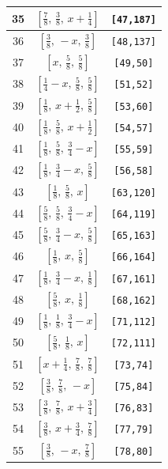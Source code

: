 \documentclass[fleqn,8pt]{jsarticle}
\begin{document}
\begin{longtable}{ccc}
35 & $\left[ \frac{7}{8},\, \frac{3}{8},\, x + \frac{1}{4} \right]$ & {\tt [47,187]} \\ \hline
36 & $\left[ \frac{3}{8},\, - x,\, \frac{3}{8} \right]$ & {\tt [48,137]} \\ \hline
37 & $\left[ x,\, \frac{5}{8},\, \frac{5}{8} \right]$ & {\tt [49,50]} \\ \hline
38 & $\left[ \frac{1}{4} - x,\, \frac{5}{8},\, \frac{5}{8} \right]$ & {\tt [51,52]} \\ \hline
39 & $\left[ \frac{1}{8},\, x + \frac{1}{2},\, \frac{5}{8} \right]$ & {\tt [53,60]} \\ \hline
40 & $\left[ \frac{1}{8},\, \frac{5}{8},\, x + \frac{1}{2} \right]$ & {\tt [54,57]} \\ \hline
41 & $\left[ \frac{1}{8},\, \frac{5}{8},\, \frac{3}{4} - x \right]$ & {\tt [55,59]} \\ \hline
42 & $\left[ \frac{1}{8},\, \frac{3}{4} - x,\, \frac{5}{8} \right]$ & {\tt [56,58]} \\ \hline
43 & $\left[ \frac{1}{8},\, \frac{5}{8},\, x \right]$ & {\tt [63,120]} \\ \hline
44 & $\left[ \frac{5}{8},\, \frac{5}{8},\, \frac{3}{4} - x \right]$ & {\tt [64,119]} \\ \hline
45 & $\left[ \frac{5}{8},\, \frac{3}{4} - x,\, \frac{5}{8} \right]$ & {\tt [65,163]} \\ \hline
46 & $\left[ \frac{1}{8},\, x,\, \frac{5}{8} \right]$ & {\tt [66,164]} \\ \hline
47 & $\left[ \frac{1}{8},\, \frac{3}{4} - x,\, \frac{1}{8} \right]$ & {\tt [67,161]} \\ \hline
48 & $\left[ \frac{5}{8},\, x,\, \frac{1}{8} \right]$ & {\tt [68,162]} \\ \hline
49 & $\left[ \frac{1}{8},\, \frac{1}{8},\, \frac{3}{4} - x \right]$ & {\tt [71,112]} \\ \hline
50 & $\left[ \frac{5}{8},\, \frac{1}{8},\, x \right]$ & {\tt [72,111]} \\ \hline
51 & $\left[ x + \frac{1}{4},\, \frac{7}{8},\, \frac{7}{8} \right]$ & {\tt [73,74]} \\ \hline
52 & $\left[ \frac{3}{8},\, \frac{7}{8},\, - x \right]$ & {\tt [75,84]} \\ \hline
53 & $\left[ \frac{3}{8},\, \frac{7}{8},\, x + \frac{3}{4} \right]$ & {\tt [76,83]} \\ \hline
54 & $\left[ \frac{3}{8},\, x + \frac{3}{4},\, \frac{7}{8} \right]$ & {\tt [77,79]} \\ \hline
55 & $\left[ \frac{3}{8},\, - x,\, \frac{7}{8} \right]$ & {\tt [78,80]} \\ \hline

\end{longtable}
\end{document}
